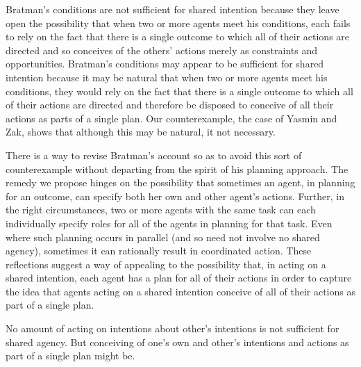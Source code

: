 \documentclass[12pt,\papersize]{extarticle}
\begin{document}
Bratman's conditions are not sufficient for shared intention because they leave open the possibility that  when two or more agents meet his conditions, each fails to rely on the fact that there is a single outcome to which all of their actions are directed and so conceives of the others' actions merely as constraints and opportunities.
Bratman's conditions may appear to be sufficient for shared intention because it may be natural that when two or more agents meet his conditions, they would rely on the fact that there is a single outcome to which all of their actions are directed and therefore be disposed to conceive of all their actions as parts of a single plan. 
Our counterexample, the case of Yasmin and Zak, shows that although this may be natural, it not necessary.

There is a way to revise Bratman's account so as to avoid this sort of counterexample without departing from the spirit of his planning approach.
The remedy we propose hinges on the possibility that sometimes an agent, in planning for an outcome, can specify both her own and other agent's actions.
Further, in the right circumstances,
two or more agents with the same task
	can each individually specify roles for all of the agents in planning for that task.
Even where such planning occurs in parallel (and so need not involve no shared agency), sometimes it can rationally result in coordinated action.
These reflections suggest a way of appealing to the possibility that, in acting on a shared intention, each agent has a plan for all of their actions
in order to capture the idea that agents acting on a shared intention conceive of all of their actions as part of a single plan.

No amount of acting on intentions about other's intentions is not sufficient for shared agency.  
But conceiving of one's own and other's intentions and actions as part of a single plan might be.



\end{document}
